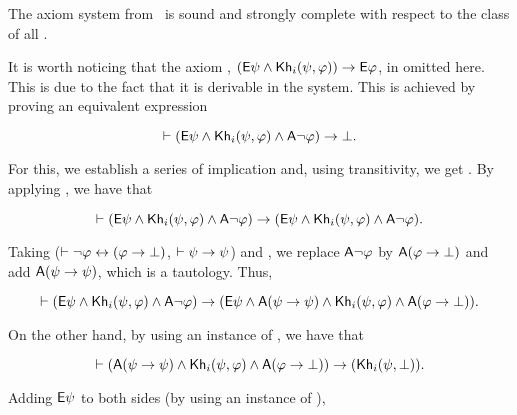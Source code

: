 \medskip

\begin{theorem}\label{th:khi-completeness}
The axiom system from~ is sound and strongly complete with respect to the class of all \ultss.
\end{theorem}

\medskip

It is worth noticing that the axiom , $\left({\sf E}\psi \land {\sf Kh}_i(\psi,\varphi)\right) \rightarrow {\sf E}\varphi$, in omitted here. This is due to the fact that it is derivable in the system.
This is achieved by proving an equivalent expression


\begin{equation}\label{eq:khe0}
\vdash ({\sf E}\psi \wedge {\sf Kh}_i(\psi,\varphi) \wedge {\sf A}\neg\varphi) \rightarrow \bot.
\end{equation}

For this, we establish a series of implication and, using transitivity, we get . By applying , we have that

\begin{equation*}
\vdash ({\sf E}\psi \wedge {\sf Kh}_i(\psi,\varphi) \wedge {\sf A}\neg\varphi) \rightarrow ({\sf E}\psi \wedge {\sf Kh}_i(\psi,\varphi) \wedge {\sf A}\neg\varphi).
\end{equation*}

Taking  ($\vdash \neg\varphi \leftrightarrow (\varphi \rightarrow \bot)$, $\vdash \psi \rightarrow \psi$) and , we replace ${\sf A}\neg\varphi$ by ${\sf A}(\varphi \rightarrow \bot)$ and add ${\sf A}(\psi \rightarrow \psi)$, which is a tautology. Thus,

\begin{equation}\label{eq:khe1}
\vdash ({\sf E}\psi \wedge {\sf Kh}_i(\psi,\varphi) \wedge {\sf A}\neg\varphi) \rightarrow ({\sf E}\psi \wedge {\sf A}(\psi \rightarrow \psi) \wedge {\sf Kh}_i(\psi,\varphi) \wedge {\sf A}(\varphi \rightarrow \bot)).
\end{equation}

On the other hand, by using an instance of , we have that

\begin{equation*}
\vdash ({\sf A}(\psi \rightarrow \psi) \wedge {\sf Kh}_i(\psi,\varphi) \wedge {\sf A}(\varphi \rightarrow \bot)) \rightarrow ({\sf Kh}_i(\psi,\bot)).
\end{equation*}

Adding ${\sf E}\psi$ to both sides (by using an instance of ),

